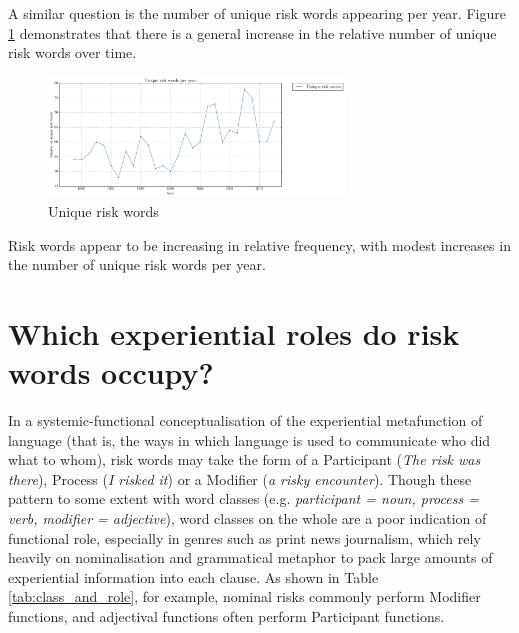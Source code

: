     A similar question is the number of unique risk words appearing per year. Figure \ref{fig:diffriskwords} demonstrates that there is a general increase in the relative number of unique risk words over time.

    \begin{figure}[htb!]
    \centering
    \includegraphics[width=0.7\textwidth]{../images/unique_risk_words_per_year.png}
    \caption{Unique risk words}
    \label{fig:diffriskwords}
    \end{figure}

    \vspace{5mm}\noindent\begin{tcolorbox}[colback=yellow!5,colframe=yellow!40!black,title=Summary: frequency of risk words]
    \parbox{1\textwidth}{%
    Risk words appear to be increasing in relative frequency, with modest increases in the number of unique risk words per year.}
    \end{tcolorbox}
    \vspace{5mm}

\section{Which experiential roles do risk words occupy?} \label{sect:exprole} \FloatBarrier

    In a systemic-functional conceptualisation of the experiential metafunction of language (that is, the ways in which language is used to communicate who did what to whom), risk words may take the form of a Participant (\emph{The risk was there}), Process (\emph{I risked it}) or a Modifier (\emph{a risky encounter}). Though these pattern to some extent with word classes (e.g. \emph{participant = noun, process = verb, modifier = adjective}), word classes on the whole are a poor indication of functional role, especially in genres such as print news journalism,  which rely heavily on nominalisation and grammatical metaphor to pack large amounts of experiential information into each clause. As shown in Table \ref{tab:class_and_role}, for example, nominal risks commonly perform Modifier functions, and adjectival functions often perform Participant functions.


